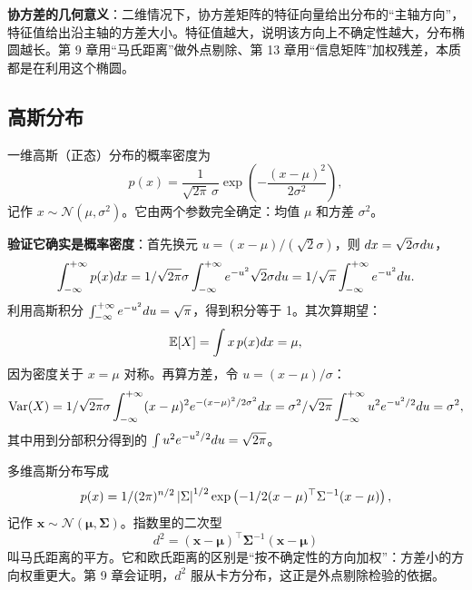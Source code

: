 \textbf{协方差的几何意义}：二维情况下，协方差矩阵的特征向量给出分布的“主轴方向”，特征值给出沿主轴的方差大小。特征值越大，说明该方向上不确定性越大，分布椭圆越长。第 9 章用“马氏距离”做外点剔除、第 13 章用“信息矩阵”加权残差，本质都是在利用这个椭圆。

\subsection{高斯分布}

一维高斯（正态）分布的概率密度为
\begin{equation}
p(x)=\frac{1}{\sqrt{2\pi}\,\sigma}\exp\left(-\frac{(x-\mu)^{2}}{2\sigma^{2}}\right),
\label{eq:02-gauss1d}
\end{equation}
记作 $x\sim\mathcal{N}(\mu,\sigma^{2})$。它由两个参数完全确定：均值 $\mu$ 和方差 $\sigma^{2}$。

\textbf{验证它确实是概率密度}：首先换元 $u=(x-\mu)/(\sqrt{2}\sigma)$，则 $d x=\sqrt{2}\sigma d u$，
\begin{equation}
\int_{-\infty}^{+\infty}p(x)d x=1/\sqrt{2\pi}\sigma\int_{-\infty}^{+\infty}e^{-u^{2}}\sqrt{2}\sigma d u
=1/\sqrt{\pi}\int_{-\infty}^{+\infty}e^{-u^{2}}d u.
\end{equation}
利用高斯积分 $\int_{-\infty}^{+\infty}e^{-u^{2}}d u=\sqrt{\pi}$，得到积分等于 1。其次算期望：
\begin{equation}
\mathbb{E}[X]=\int x\,p(x)d x=\mu,
\end{equation}
因为密度关于 $x=\mu$ 对称。再算方差，令 $u=(x-\mu)/\sigma$：
\begin{equation}
\operatorname{Var}(X)=1/\sqrt{2\pi}\sigma\int_{-\infty}^{+\infty}(x-\mu)^{2}e^{-(x-\mu)^{2}/2\sigma^{2}}d x
=\sigma^{2}/\sqrt{2\pi}\int_{-\infty}^{+\infty}u^{2}e^{-u^{2}/2}d u=\sigma^{2},
\end{equation}
其中用到分部积分得到的 $\int u^{2}e^{-u^{2}/2}d u=\sqrt{2\pi}$。

多维高斯分布写成
\begin{equation}
p(x)=1/(2\pi)^{n/2}\left\lvert \Sigma \right\rvert^{1/2}
\exp\left(-1/2(x-\mu)^{\top}\Sigma^{-1}(x-\mu)\right),
\label{eq:02-gaussnd}
\end{equation}
记作 $\bm{x}\sim\mathcal{N}(\bm{\mu},\bm{\Sigma})$。指数里的二次型
\begin{equation}
d^{2}=(\bm{x}-\bm{\mu})^{\top}\bm{\Sigma}^{-1}(\bm{x}-\bm{\mu})
\label{eq:02-mahal}
\end{equation}
叫马氏距离的平方。它和欧氏距离的区别是“按不确定性的方向加权”：方差小的方向权重更大。第 9 章会证明，$d^{2}$ 服从卡方分布，这正是外点剔除检验的依据。

